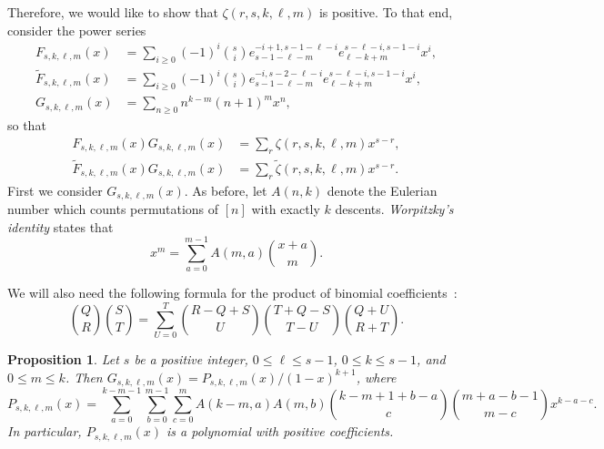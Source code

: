 \documentclass[11pt]{amsart}
\newtheorem{proposition}[theorem]{Proposition}
\theoremstyle{definition}
\newcommand{\0}{\emptyset}
\newcommand{\elm}[2]{e_{#1}^{#2}} %
\begin{document}
Therefore, we would like to show that $\zeta(r,s,k,\ell,m)$ is positive.
To that end, consider the power series
\begin{align*}
F_{s,k,\ell,m}(x)&=\sum_{i\geq 0}(-1)^i\binom{s}{i} \elm{s-1-\ell-m}{-i+1,s-1-\ell-i} \elm{\ell-k+m}{s-\ell-i,s-1-i}x^i,\\
\tilde F_{s,k,\ell,m}(x) &= \sum_{i\geq 0}(-1)^i\binom{s}{i} \elm{s-1-\ell-m}{-i,s-2-\ell-i} \elm{\ell-k+m}{s-\ell-i,s-1-i}x^i,\\
G_{s,k,\ell,m}(x)&=\sum_{n\geq 0}n^{k-m}(n+1)^mx^n,
\end{align*}
so that
\begin{subequations}
\begin{align}
F_{s,k,\ell,m}(x)G_{s,k,\ell,m}(x) &= \sum_r \zeta(r,s,k,\ell,m) x^{s-r}, \label{FGzeta} \\
\tilde F_{s,k,\ell,m}(x)G_{s,k,\ell,m}(x) &= \sum_r \tilde\zeta(r,s,k,\ell,m) x^{s-r}. \label{FGzetatilde}
\end{align}
\end{subequations}
First we consider $G_{s,k,\ell,m}(x)$.  As before, let $A(n,k)$ denote the Eulerian number which counts permutations of $[n]$ with exactly $k$ descents.
\textit{Worpitzky's identity} \cite[p.269]{concretemath} states that
\begin{equation} \label{worpitzky}
x^m = \sum_{a=0}^{m-1} A(m,a) \binom{x+a}{m}.
\end{equation}

We will also need the following formula for the product of binomial coefficients~\cite[p.171]{concretemath}:
\begin{equation}\label{binomials}
\binom{Q}{R} \binom{S}{T} = \sum_{U=0}^T \binom{R-Q+S}{U} \binom{T+Q-S}{T-U} \binom{Q+U}{R+T}.
\end{equation}

\begin{proposition}\label{prop:Gprop}
Let $s$ be a positive integer, $0\leq \ell\leq s-1$, $0\leq k\leq s-1$, and $0\leq m\leq k$.
Then $G_{s,k,\ell,m}(x) = P_{s,k,\ell,m}(x)/(1-x)^{k+1}$, where
\[
P_{s,k,\ell,m}(x)=\sum_{a=0}^{k-m-1}\sum_{b=0}^{m-1}\sum_{c=0}^m A(k-m,a)A(m,b)\binom{k-m+1+b-a}{c}\binom{m+a-b-1}{m-c}x^{k-a-c}.
\]
In particular, $P_{s,k,\ell,m}(x)$ is a polynomial with positive coefficients.
\end{proposition}
\end{document}
